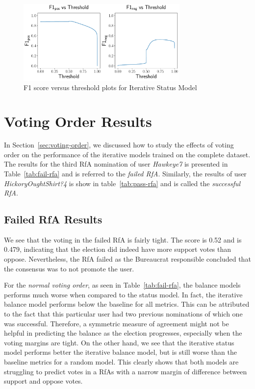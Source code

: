 \begin{figure}[htp]
    \centering
    \includegraphics[width=0.75\textwidth]{images/iterative_Status_f1.pdf}
    \caption{F1 score versus threshold plots for Iterative Status Model}
    \label{fig:complete-iterative-status-f1}
\end{figure}


\section{Voting Order Results}
\label{sec:voting-order-results}
In Section~\ref{sec:voting-order}, we discussed how to study the effects of voting order on the performance of the iterative models trained on the complete \wikirfa dataset.
The results for the third RfA nomination  of user \textit{Hawkeye7} is presented in Table~\ref{tab:fail-rfa} and is referred to the \textit{failed RfA}.
Similarly, the results of user \textit{HickoryOughtShirt?4} is show in table~\ref{tab:pass-rfa} and is called the \textit{successful RfA}.

\subsection{Failed RfA Results}
We see that the voting in the failed RfA is fairly tight.
The \aucposPR score is 0.52 and \aucnegPR is 0.479, indicating that the election did indeed have more support votes than oppose.
Nevertheless, the RfA failed as the Bureaucrat responsible concluded that the consensus was to not promote the user.

For the \textit{normal voting order}, as seen in Table~\ref{tab:fail-rfa}, the balance models performs much worse when compared to the status model.
In fact, the iterative balance model performs below the baseline for all metrics.
This can be attributed to the fact that this particular user had two previous nominations of which one was successful.
Therefore, a symmetric measure of agreement might not be helpful in predicting the balance as the election progresses, especially when the voting margins are tight.
On the other hand, we see that the iterative status model performs better the iterative balance model, but is still worse than the baseline metrics for a random model.
This clearly shows that both models are struggling to predict votes in a RfAs with a narrow margin of difference between support and oppose votes.  

